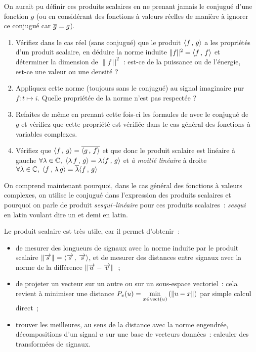 \begin{exercice}
  On aurait pu définir ces produits scalaires en ne prenant jamais le
  conjugué d'une fonction $g$ (ou en considérant des fonctions à
  valeurs réelles de manière à ignorer ce conjugué car $\overline{g}=g$).
  \begin{enumerate}
  \item Vérifiez dans le cas réel (sans conjugué) que le produit
    $\langle f\,,\,g\rangle$ a les propriétés d'un produit scalaire, en déduire
    la norme induite $\|f\|^2=\langle f\,,\,f\rangle$ et déterminer la dimension
    de $\|f\|^2$ : est-ce de la puissance ou de l'énergie, est-ce une
    valeur ou une densité ?
  \item Appliquez cette norme (toujours sans le conjugué) au signal
    imaginaire pur $f: t\mapsto i$. Quelle propriétée de la norme
    n'est pas respectée ?
  \item Refaites de même en prenant cette fois-ci les formules de
     avec le conjugué de $g$ et vérifiez que
    cette propriété est vérifiée dans le cas général des fonctions à
    variables complexes.
  \item Vérifiez que $\langle f\,,\,g\rangle=\overline{\langle g\,,\,f\rangle}$ et que donc le
    produit scalaire est linéaire à gauche
    $\forall\lambda\in\mathbb{C},\; \langle\lambda\,f\,,\,g\rangle=\lambda\langle f\,,\,g\rangle$
    et \emph{à moitié linéaire} à droite
    $\forall \lambda\in\mathbb{C},\;
    \langle f\,,\,\lambda\,g\rangle=\overline{\lambda}\langle f\,,\,g\rangle$
  \end{enumerate}
  On comprend maintenant pourquoi, dans le cas général des fonctions à
  valeurs complexes, on utilise le conjugué dans l'expression des
  produits scalaires et pourquoi on parle de produit
  \emph{sesqui--linéaire} pour ces produits scalaires~: \emph{sesqui}
  en latin voulant dire \og{}un et demi\fg{} en latin.
\end{exercice}

Le produit scalaire est très utile, car il permet d'obtenir~:
\begin{itemize}
\item de mesurer des longueurs de signaux avec la norme induite par le
  produit scalaire $\left\|\overrightarrow{s}\right\|=\langle\overrightarrow{s}\,,\,\overrightarrow{s}\rangle$, et de
  mesurer des distances entre signaux avec la norme de la différence
  $\left\|\overrightarrow{u}-\overrightarrow{v}\right\|$~;
\item de projeter un vecteur sur un autre ou sur un sous-espace
  vectoriel~: cela revient à minimiser une distance
  $P_v(u)=\min\limits_{x\in\mathrm{vect}\left(u\right)}\left(\left\|u-x\right\|\right)$ par simple calcul
  direct~;
  
\item trouver les meilleures, au sens de la distance avec la norme
  engendrée, décompositions d'un signal $u$ sur une base de vecteurs
  données~: calculer des transformées de signaux.
\end{itemize}

